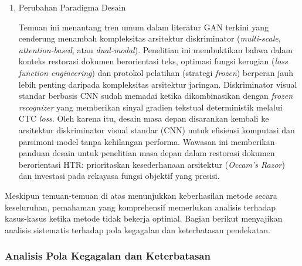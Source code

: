 \documentclass[12pt,a4paper]{article}
\begin{document}
\begin{enumerate}[leftmargin=1.5em, labelsep=0.5em, itemindent=0pt, label=\arabic*., topsep=0pt, partopsep=0pt]
    \item Perubahan Paradigma Desain
    
    Temuan ini menantang tren umum dalam literatur GAN terkini yang cenderung menambah kompleksitas arsitektur diskriminator (\textit{multi-scale}, \textit{attention-based}, atau \textit{dual-modal}). Penelitian ini membuktikan bahwa dalam konteks restorasi dokumen berorientasi teks, optimasi fungsi kerugian (\textit{loss function engineering}) dan protokol pelatihan (strategi \textit{frozen}) berperan jauh lebih penting daripada kompleksitas arsitektur jaringan. Diskriminator visual standar berbasis CNN sudah memadai ketika dikombinasikan dengan \textit{frozen recognizer} yang memberikan sinyal gradien tekstual deterministik melalui CTC \textit{loss}. Oleh karena itu, desain masa depan disarankan kembali ke arsitektur diskriminator visual standar (CNN) untuk efisiensi komputasi dan parsimoni model tanpa kehilangan performa. Wawasan ini memberikan panduan desain untuk penelitian masa depan dalam restorasi dokumen berorientasi HTR: prioritaskan kesederhanaan arsitektur (\textit{Occam's Razor}) dan investasi pada rekayasa fungsi objektif yang presisi.
\end{enumerate}

Meskipun temuan-temuan di atas menunjukkan keberhasilan metode secara keseluruhan, pemahaman yang komprehensif memerlukan analisis terhadap kasus-kasus ketika metode tidak bekerja optimal. Bagian berikut menyajikan analisis sistematis terhadap pola kegagalan dan keterbatasan pendekatan.

\subsubsection{Analisis Pola Kegagalan dan Keterbatasan}
\label{subsubsec:analisis-kegagalan}
\end{document}
